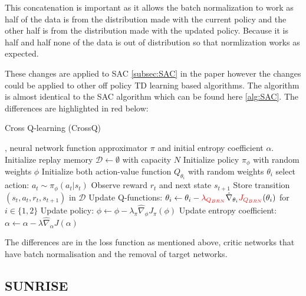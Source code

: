 This concatenation is important as it allows the batch normalization to work as half of the data is from the distribution made with the current policy and the other half is from the distribution made with the updated policy. Because it is half and half none of the data is out of distribution so that normlization works as expected.

These changes are applied to SAC \ref{subsec:SAC} in the paper however the changes could be applied to other off policy TD learning based algorithms. The algorithm is almost identical to the SAC algorithm which can be found here \ref{alg:SAC}. The differences are highlighted in red below:


\begin{algorithm}[H]
\caption{Cross Q-learning (CrossQ)}
\label{alg:CROSSQ}
\begin{algorithmic}[1]
, neural network function approximator $\pi$ and initial entropy coefficient $\alpha$.
\State Initialize replay memory $\mathcal{D} \leftarrow \emptyset$ with capacity $N$
\State Initialize policy $\pi_{\phi}$ with random weights $\phi$
\State Initialize both action-value function $Q_{\theta_i}$ with random weights 
$\theta_i$
\Repeat
        \State select action: $a_{t} \sim \pi_{\phi}(a_{t} | s_{t})$
        \State Observe reward $r_{t}$ and next state $s_{t+1}$
        \State Store transition $(s_{t}, a_{t}, r_{t}, s_{t+1})$ in $\mathcal{D}$
    \EndFor
        \State Update Q-functions: $\theta_{i} \gets \theta_{i} - \textcolor{red}{\lambda_{Q_{BRN}}} \hat{\nabla}_{\theta_{i}} \textcolor{red}{J_{Q_{BRN}}}(\theta_{i})$ for $i \in \{1,2\}$
        \State Update policy: $\phi \gets \phi - \lambda_{\pi} \hat{\nabla}_{\phi} J_{\pi}(\phi)$
        \State Update entropy coefficient: $\alpha \gets \alpha - \lambda \hat{\nabla}_{\alpha} J(\alpha)$
    \EndFor
{}

\end{algorithmic}
\end{algorithm}
The differences are in the loss function as mentioned above, critic networks that have batch normalisation and the removal of target networks.

\subsection{SUNRISE}\label{subsec:SUNRISE}


